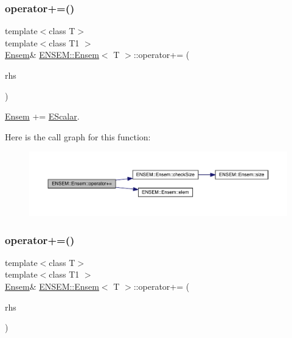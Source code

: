 \subsubsection{\texorpdfstring{operator+=()}{operator+=()}\hspace{0.1cm}{\footnotesize\ttfamily [3/6]}}
{\footnotesize\ttfamily template$<$class T$>$ \\
template$<$class T1 $>$ \\
\mbox{\hyperlink{classENSEM_1_1Ensem}{Ensem}}\& \mbox{\hyperlink{classENSEM_1_1Ensem}{E\+N\+S\+E\+M\+::\+Ensem}}$<$ T $>$\+::operator+= (\begin{DoxyParamCaption}\item[{const \mbox{\hyperlink{classENSEM_1_1EScalar}{E\+Scalar}}$<$ T1 $>$ \&}]{rhs }\end{DoxyParamCaption})\hspace{0.3cm}{\ttfamily [inline]}}



\mbox{\hyperlink{classENSEM_1_1Ensem}{Ensem}} += \mbox{\hyperlink{classENSEM_1_1EScalar}{E\+Scalar}}. 

Here is the call graph for this function\+:
\nopagebreak
\begin{figure}[H]
\begin{center}
\leavevmode
\includegraphics[width=350pt]{d7/d3e/classENSEM_1_1Ensem_a3b36653814508e90b22543a3f1b465d5_cgraph}
\end{center}
\end{figure}
\mbox{\label{classENSEM_1_1Ensem_ae24bd27a7f5a8ffed6ad4361956596fd}} 
\subsubsection{\texorpdfstring{operator+=()}{operator+=()}\hspace{0.1cm}{\footnotesize\ttfamily [4/6]}}
{\footnotesize\ttfamily template$<$class T$>$ \\
template$<$class T1 $>$ \\
\mbox{\hyperlink{classENSEM_1_1Ensem}{Ensem}}\& \mbox{\hyperlink{classENSEM_1_1Ensem}{E\+N\+S\+E\+M\+::\+Ensem}}$<$ T $>$\+::operator+= (\begin{DoxyParamCaption}\item[{const \mbox{\hyperlink{classENSEM_1_1Ensem}{Ensem}}$<$ T1 $>$ \&}]{rhs }\end{DoxyParamCaption})\hspace{0.3cm}{\ttfamily [inline]}}



